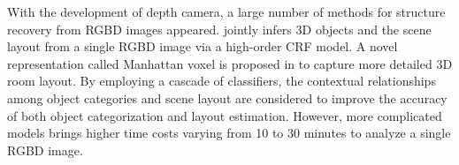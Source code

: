 {%
With the development of depth camera, a large number of methods for structure recovery from RGBD images appeared. 
%
\cite{geiger2015joint} jointly infers 3D objects and the scene layout from a single RGBD image via a high-order CRF model.  
%
A novel representation called Manhattan voxel is proposed in \cite{ren2016three} to capture more detailed 3D room layout. 
By employing a cascade of classifiers, the contextual relationships among object categories and scene layout are considered to improve the accuracy of both object categorization and layout estimation. 
However, more complicated models brings higher time costs varying from 10 to 30 minutes to analyze a single RGBD image. 





}
